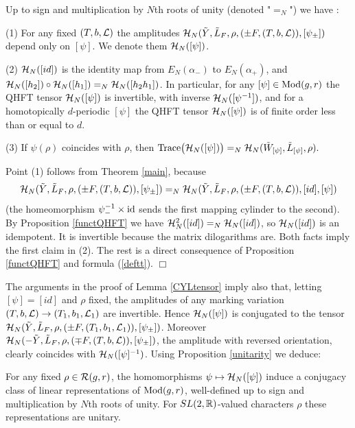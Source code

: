 \begin{lem}\label{CYLtensor} Up to sign and multiplication by
  $N$th roots of unity (denoted "$=_N$") we have :

\smallskip

(1) For any fixed $(T,b,{\mathcal L})$ the amplitudes
${\mathcal H}_N(\tilde{Y},\tilde{L}_F,\rho,(\pm F,(T,b,{\mathcal L})), [\psi_\pm])$
depend only on $[\psi]$. We denote them ${\mathcal H}_N([\psi])$.
\smallskip

  (2) ${\mathcal H}_N([id])$ is the identity map from $E_N(\alpha_-)$ to
  $E_N(\alpha_+)$, and ${\mathcal H}_N([h_2])\circ {\mathcal H}_N([h_1]) =_N
  {\mathcal H}_N([h_2h_1])$. In particular, for any $[\psi] \in {\rm Mod}(g,r)$
  the QHFT tensor ${\mathcal H}_N([\psi])$ is invertible, with inverse
  ${\mathcal H}_N([\psi^{-1}])$, and for a homotopically $d$-periodic $[\psi]$
  the QHFT tensor ${\mathcal H}_N([\psi])$ is of finite order less than or
  equal to $d$.  \smallskip

  (3) If $\psi(\rho)$ coincides with $\rho$, then ${\rm
    Trace}\bigl({\mathcal H}_N([\psi])\bigr)=_N{\mathcal H}_N(\tilde{W}_{[\psi]},
  \tilde{L}_{[\psi]},\rho).$
\end{lem}
 Point (1) follows from Theorem \ref{main},
because $${\mathcal H}_N(\tilde{Y},\tilde{L}_F,\rho,(\pm
F,(T,b,{\mathcal L})),[\psi_\pm]) =_N {\mathcal H}_N(\tilde{Y},\tilde{L}_F,\rho,(\pm
F,(T,b,{\mathcal L})),[id],[\psi])$$ (the homeomorphism $\psi_-^{-1} \times
{\rm id}$ sends the first mapping cylinder to the second). By
Proposition \ref{functQHFT} we have ${\mathcal H}_N^2([id]) =_N
{\mathcal H}_N([id])$, so ${\mathcal H}_N([id])$ is an idempotent. It is invertible
because the matrix dilogarithms are. Both facts imply the first
claim in (2). The rest is a direct consequence of Proposition
\ref{functQHFT} and formula (\ref{deftt}). \hfill $\Box$
\medskip

The arguments in the proof of Lemma \ref{CYLtensor} imply also
that, letting $[\psi] = [id]$ and $\rho$ fixed, the amplitudes of
any marking variation $(T,b,{\mathcal L}) \rightarrow (T_1,b_1,{\mathcal L}_1)$ are
invertible. Hence ${\mathcal H}_N([\psi])$ is conjugated to the tensor
${\mathcal H}_N(\tilde{Y},\tilde{L}_F,\rho,(\pm F,(T_1,b_1,{\mathcal L}_1)),
[\psi_\pm])$. Moreover ${\mathcal H}_N(-\tilde{Y},\tilde{L}_F,\rho,(\mp
F,(T,b,{\mathcal L})), [\psi_\pm])$, the amplitude with reversed
orientation, clearly coincides with ${\mathcal H}_N([\psi]^{-1})$. Using
Proposition \ref{unitarity} we deduce:
\begin{cor}\label{mcgrep} For any fixed $\rho\in {\mathcal R}(g,r)$, the homomorphisms
$\psi \mapsto {\mathcal H}_N([\psi])$ induce a conjugacy class of
  linear representations of ${\rm Mod}(g,r)$, well-defined up to sign and
  multiplication by $N$th roots of unity. For $SL(2,\mathbb{R})$-valued
  characters $\rho$ these representations are unitary.
\end{cor}

